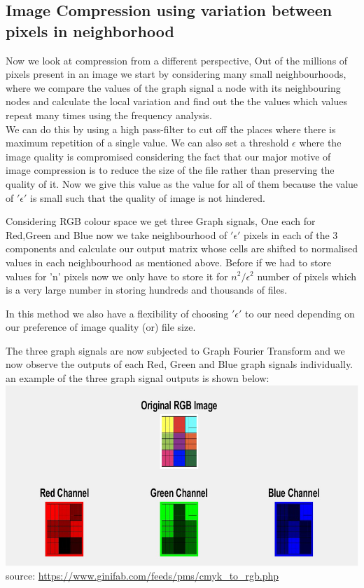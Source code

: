 \documentclass[12pt,onecolumn]{article}
\begin{document}
\subsection{Image Compression using variation between pixels in neighborhood}
Now we look at compression from a different perspective, Out of the millions of pixels present in an image we start by considering many small neighbourhoods, where we compare the values of the graph signal a node with its neighbouring nodes and calculate the local variation and find out the the values which values repeat many times using the frequency analysis.\\
\newline
We can do this by using a high pass-filter to cut off the places where there is maximum repetition of a single value. We can also set a threshold {\Large $ \epsilon $ } where the image quality is compromised considering the fact that our major motive of image compression is to reduce the size of the file rather than preserving the quality of it. Now we give this value as the value for all of them because the value of {\Large $ '\epsilon' $ } is small such that the quality of image is not hindered.\\
\newline

Considering RGB colour space we get three Graph signals, One each for Red,Green and Blue now we take neighbourhood of {\Large $ '\epsilon' $ } pixels in each of the 3 components and calculate our output matrix whose cells are shifted to normalised values in each neighbourhood as mentioned above. Before if we had to store values for 'n' pixels now we only have to store it for {\Large $ n^{2}/\epsilon^{2} $ } number of pixels which is a very large number in storing hundreds and thousands of files.\\
\newline

In this method we also have a flexibility of choosing {\Large $ '\epsilon' $} to our need depending on our preference of image quality (or) file size.

The three graph signals are now subjected to Graph Fourier Transform and we now observe the outputs of each Red, Green and Blue graph signals individually. \\
\newline
an example of the three graph signal outputs is shown below: \\
\includegraphics{images/RGB1.png} 
source: \url{ https://www.ginifab.com/feeds/pms/cmyk_to_rgb.php}
\newline
\end{document}

